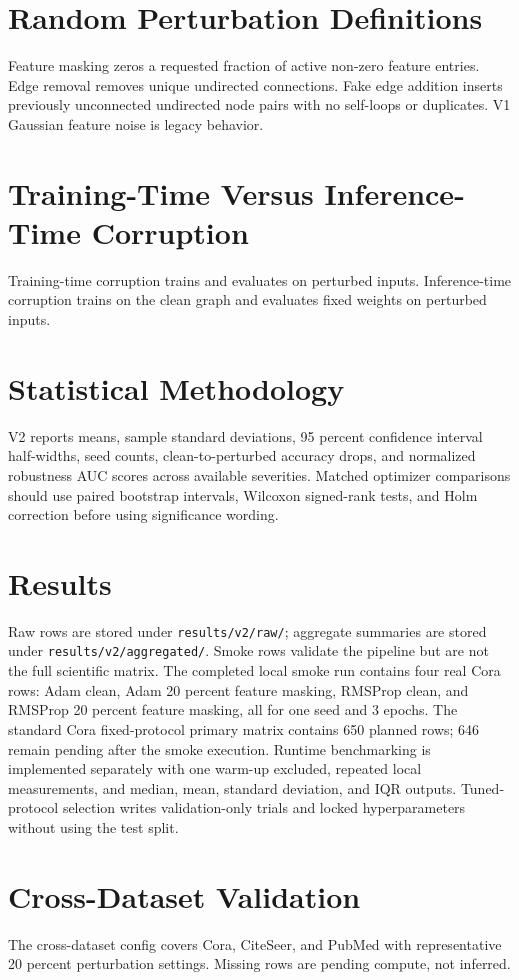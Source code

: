 \documentclass[11pt]{article}
\begin{document}
\section{Random Perturbation Definitions}
Feature masking zeros a requested fraction of active non-zero feature entries. Edge removal removes unique undirected connections. Fake edge addition inserts previously unconnected undirected node pairs with no self-loops or duplicates. V1 Gaussian feature noise is legacy behavior.
\section{Training-Time Versus Inference-Time Corruption}
Training-time corruption trains and evaluates on perturbed inputs. Inference-time corruption trains on the clean graph and evaluates fixed weights on perturbed inputs.
\section{Statistical Methodology}
V2 reports means, sample standard deviations, 95 percent confidence interval half-widths, seed counts, clean-to-perturbed accuracy drops, and normalized robustness AUC scores across available severities. Matched optimizer comparisons should use paired bootstrap intervals, Wilcoxon signed-rank tests, and Holm correction before using significance wording.
\section{Results}
Raw rows are stored under \texttt{results/v2/raw/}; aggregate summaries are stored under \texttt{results/v2/aggregated/}. Smoke rows validate the pipeline but are not the full scientific matrix. The completed local smoke run contains four real Cora rows: Adam clean, Adam 20 percent feature masking, RMSProp clean, and RMSProp 20 percent feature masking, all for one seed and 3 epochs. The standard Cora fixed-protocol primary matrix contains 650 planned rows; 646 remain pending after the smoke execution. Runtime benchmarking is implemented separately with one warm-up excluded, repeated local measurements, and median, mean, standard deviation, and IQR outputs. Tuned-protocol selection writes validation-only trials and locked hyperparameters without using the test split.
\section{Cross-Dataset Validation}
The cross-dataset config covers Cora, CiteSeer, and PubMed with representative 20 percent perturbation settings. Missing rows are pending compute, not inferred.
\end{document}
